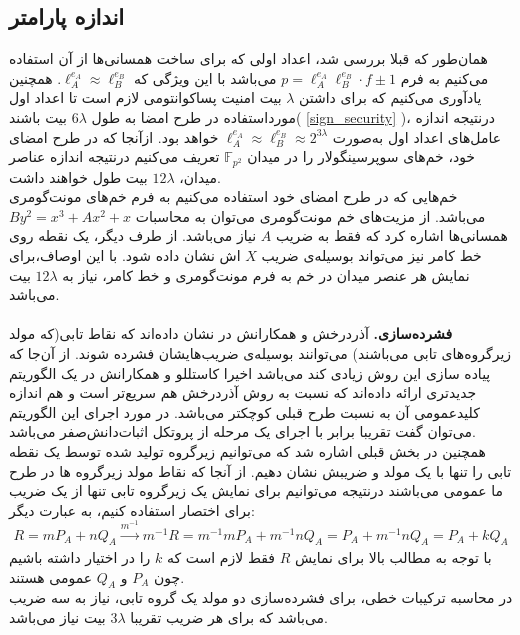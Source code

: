 
\subsection{ اندازه پارامتر}\label{size_parameter} 
همان‌طور که  قبلا بررسی شد، اعداد اولی که برای ساخت همسانی‌ها از آن استفاده می‌کنیم به فرم
$p = \ell_A^{e_A} \ell_B^{e_B} \cdot f \pm 1$
می‌باشد با این ویژگی که 
$\ell_A^{e_A} \approx \ell_B^{e_B}$.
همچنین یادآوری می‌کنیم که برای داشتن 
$\lambda$
بیت امنیت پساکوانتومی لازم است تا اعداد اول مورداستفاده در طرح امضا به طول
$6 \lambda$
بیت باشند(
\ref{sign_security}
)، درنتیجه اندازه عامل‌های اعداد اول به‌صورت
$\ell_A^{e_A} \approx \ell_B^{e_B} \approx 2^{3 \lambda}$
خواهد بود.
ازآنجا که در طرح امضای خود، خم‌های سوپرسینگولار را در میدان
$\mathbb{F}_{p^2}$
تعریف می‌کنیم درنتیجه اندازه عناصر میدان،
$12\lambda$
بیت طول خواهند داشت.
\\
خم‌هایی که در طرح امضای خود استفاده می‌کنیم به فرم خم‌های مونت‌گومری
\\ 
$By^2 = x^3 + Ax^2 + x$
می‌باشد. از مزیت‌های خم‌ مونت‌گومری می‌توان به محاسبات همسانی‌ها اشاره کرد که فقط به ضریب
$A$
نیاز می‌باشد.
از طرف دیگر، یک نقطه روی خط کامر
 نیز می‌تواند بوسیله‌ی ضریب
$X$
اش نشان داده شود.
 با این اوصاف،برای نمایش هر عنصر میدان در خم به فرم مونت‌گومری و خط کامر، نیاز به 
$12 \lambda$
بیت می‌باشد.
\\
\\
\textbf{فشرده‌سازی.}
آذردرخش و همکارانش در
\cite{azarderakhsh_key_compress}
نشان داده‌اند که نقاط تابی(که مولد زیرگروه‌های تابی می‌باشند) می‌توانند بوسیله‌ی ضریب‌هایشان فشرده شوند. از آن‌جا که پیاده ‌سازی این روش زیادی کند می‌باشد اخیرا کاستللو و همکارانش در
\cite{costello_efficientkey_compress}
یک الگوریتم جدیدتری ارائه داده‌اند که نسبت به روش آذردرخش  هم سریع‌تر است و هم اندازه کلیدعمومی  آن به نسبت طرح قبلی کوچکتر می‌باشد. در مورد اجرای این الگوریتم می‌توان گفت تقریبا برابر با اجرای یک مرحله از پروتکل اثبات‌دانش‌صفر می‌باشد.
\\
همچنین در بخش قبلی اشاره شد که می‌توانیم  زیرگروه تولید شده توسط یک نقطه تابی را تنها با یک مولد و ضریبش نشان دهیم. از آنجا که نقاط مولد زیرگروه ‌‌ها در طرح ما عمومی می‌باشند درنتیجه می‌توانیم برای نمایش یک زیرگروه تابی تنها از یک  ضریب برای اختصار استفاده کنیم، به عبارت دیگر: 
$$ 
R = mP_A + nQ_A  \xrightarrow[]{m^{-1}}
m^{-1}R=m^{-1}mP_A + m^{-1}nQ_A = P_A + m^{-1}nQ_A = P_A + k Q_A 
$$
با توجه به مطالب بالا برای نمایش
$R$
فقط لازم است که 
$k$
را در اختیار داشته باشیم چون 
$P_A$
و
$Q_A$
عمومی هستند.
\\
در محاسبه ترکیبات  خطی‌، برای فشرده‌‌سازی دو مولد یک گروه تابی، نیاز به سه ضریب  می‌باشد که برای هر ضریب  تقریبا 
$3 \lambda$
بیت نیاز می‌باشد.
\\
